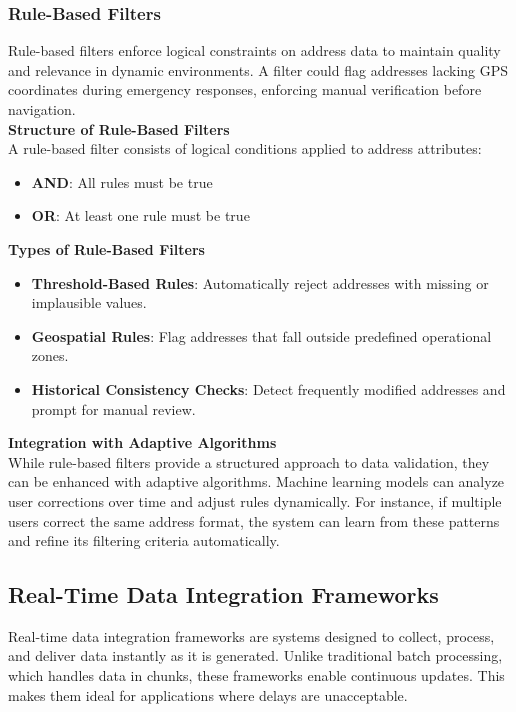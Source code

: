         
        \subsubsection{Rule-Based Filters}
        \label{sssec:rule-based-filters}
        
        Rule-based filters enforce logical constraints on address data to maintain quality and relevance in dynamic environments. A filter could flag addresses lacking GPS coordinates during emergency responses, enforcing manual verification before navigation.\\
        
        
        \textbf{Structure of Rule-Based Filters}\\
        A rule-based filter consists of logical conditions applied to address attributes:
        \begin{itemize}
            \item \textbf{AND}: All rules must be true
            \item \textbf{OR}: At least one rule must be true
        \end{itemize}
        

        \textbf{Types of Rule-Based Filters}
        \begin{itemize}
            \item \textbf{Threshold-Based Rules}: Automatically reject addresses with missing or implausible values.
            \item \textbf{Geospatial Rules}: Flag addresses that fall outside predefined operational zones.
            \item \textbf{Historical Consistency Checks}: Detect frequently modified addresses and prompt for manual review.
        \end{itemize}
        
        \textbf{Integration with Adaptive Algorithms}\\
        While rule-based filters provide a structured approach to data validation, they can be enhanced with adaptive algorithms. Machine learning models can analyze user corrections over time and adjust rules dynamically. For instance, if multiple users correct the same address format, the system can learn from these patterns and refine its filtering criteria automatically.
        

    \subsection{Real-Time Data Integration Frameworks}
    Real-time data integration frameworks are systems designed to collect, process, and deliver data instantly as it is generated. Unlike traditional batch processing, which handles data in chunks, these frameworks enable continuous updates. This makes them ideal for applications where delays are unacceptable.

